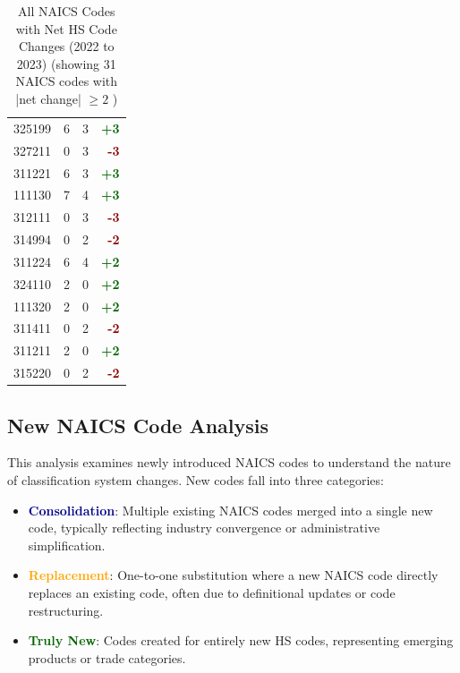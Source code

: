 \documentclass[11pt]{article}
\begin{document}
\begin{table}[H]
\begin{minipage}{0.48\textwidth}
\begin{tabular}{lrrr}
325199 & 6 & 3 & \textcolor{darkgreen}{\textbf{+3}} \\
327211 & 0 & 3 & \textcolor{darkred}{\textbf{-3}} \\
311221 & 6 & 3 & \textcolor{darkgreen}{\textbf{+3}} \\
111130 & 7 & 4 & \textcolor{darkgreen}{\textbf{+3}} \\
312111 & 0 & 3 & \textcolor{darkred}{\textbf{-3}} \\
314994 & 0 & 2 & \textcolor{darkred}{\textbf{-2}} \\
311224 & 6 & 4 & \textcolor{darkgreen}{\textbf{+2}} \\
324110 & 2 & 0 & \textcolor{darkgreen}{\textbf{+2}} \\
111320 & 2 & 0 & \textcolor{darkgreen}{\textbf{+2}} \\
311411 & 0 & 2 & \textcolor{darkred}{\textbf{-2}} \\
311211 & 2 & 0 & \textcolor{darkgreen}{\textbf{+2}} \\
315220 & 0 & 2 & \textcolor{darkred}{\textbf{-2}} \\
\bottomrule
\end{tabular}
\end{minipage}
\caption{All NAICS Codes with Net HS Code Changes (2022 to 2023) (showing 31 NAICS codes with |net change| $\geq 2$ )}
\end{table}


\subsection{New NAICS Code Analysis}

This analysis examines newly introduced NAICS codes to understand the nature of classification system changes. New codes fall into three categories:

\begin{itemize}
    \item \textcolor{darkblue}{\textbf{Consolidation}}: Multiple existing NAICS codes merged into a single new code, typically reflecting industry convergence or administrative simplification.
    \item \textcolor{orange}{\textbf{Replacement}}: One-to-one substitution where a new NAICS code directly replaces an existing code, often due to definitional updates or code restructuring.
    \item \textcolor{darkgreen}{\textbf{Truly New}}: Codes created for entirely new HS codes, representing emerging products or trade categories.
\end{itemize}
\end{document}
